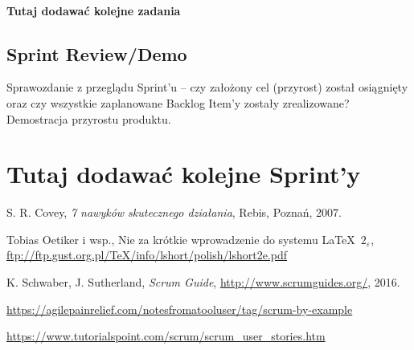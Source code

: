\documentclass[a4paper]{article}
\begin{document}
\paragraph{Tutaj dodawać kolejne zadania}


\subsection{Sprint Review/Demo}
Sprawozdanie z przeglądu Sprint'u -- czy założony cel (przyrost) został osiągnięty oraz czy wszystkie zaplanowane Backlog Item'y zostały zrealizowane? Demostracja przyrostu produktu.


\section*{Tutaj dodawać kolejne Sprint'y}


\begin{thebibliography}{9}

 S. R. Covey, {\em 7 nawyków skutecznego działania}, Rebis, Poznań, 2007.

 Tobias Oetiker i wsp., Nie za krótkie wprowadzenie do systemu \LaTeX  \ $2_\varepsilon$, \url{ftp://ftp.gust.org.pl/TeX/info/lshort/polish/lshort2e.pdf}

 K. Schwaber, J. Sutherland, {\em Scrum Guide}, \url{http://www.scrumguides.org/}, 2016.

 \url{https://agilepainrelief.com/notesfromatooluser/tag/scrum-by-example}

 \url{https://www.tutorialspoint.com/scrum/scrum_user_stories.htm}

\end{thebibliography}
\end{document}
